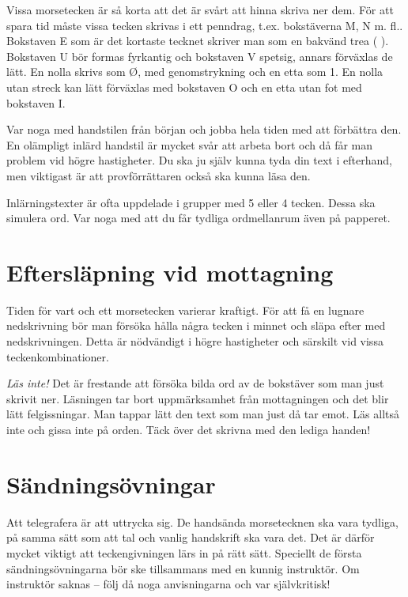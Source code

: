 Vissa morsetecken är så korta att det är svårt att hinna skriva ner dem. För att
spara tid måste vissa tecken skrivas i ett penndrag, t.ex. bokstäverna M, N m.
fl.. Bokstaven E som är det kortaste tecknet skriver man som en bakvänd trea
(  ). Bokstaven U bör formas fyrkantig och bokstaven V spetsig, annars
förväxlas de lätt. En nolla skrivs som Ø, med genomstrykning och en etta som 1.
En nolla utan streck kan lätt förväxlas med bokstaven O och en etta utan fot med
bokstaven I.

Var noga med handstilen från början och jobba hela tiden med att förbättra den.
En olämpligt inlärd handstil är mycket svår att arbeta bort och då får man
problem vid högre hastigheter. Du ska ju själv kunna tyda din text i
efterhand, men viktigast är att provförrättaren också ska kunna läsa den.

Inlärningstexter är ofta uppdelade i grupper med 5 eller 4 tecken. Dessa ska
simulera ord. Var noga med att du får tydliga ordmellanrum även på papperet.

\section{Eftersläpning vid mottagning}

Tiden för vart och ett morsetecken varierar kraftigt. För att få en lugnare
nedskrivning bör man försöka hålla några tecken i minnet och släpa efter med
nedskrivningen. Detta är nödvändigt i högre hastigheter och särskilt vid vissa
teckenkombinationer.

\emph{Läs inte!} Det är frestande att försöka bilda ord av de bokstäver som man
just skrivit ner. Läsningen tar bort uppmärksamhet från mottagningen och det
blir lätt felgissningar. Man tappar lätt den text som man just då tar emot. Läs
alltså inte och gissa inte på orden. Täck över det skrivna med den lediga
handen!

\section{Sändningsövningar}

Att telegrafera är att uttrycka sig. De handsända morsetecknen ska vara
tydliga, på samma sätt som att tal och vanlig handskrift ska vara det. Det är
därför mycket viktigt att teckengivningen lärs in på rätt sätt. Speciellt de
första sändningsövningarna bör ske tillsammans med en kunnig instruktör. Om
instruktör saknas -- följ då noga anvisningarna och var självkritisk!

